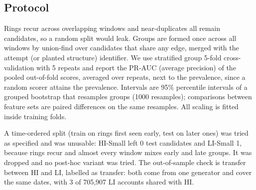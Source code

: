 \documentclass[conference]{IEEEtran}
\begin{document}
\begin{table}[t]
\caption{Primary-variant data (ambiguous candidates excluded). Prevalence is the share of positive candidates; the effective sample size is the number of positive groups. IBM: $\tau$ quantile 0.05, maximum ring length 6, 5-day windows. Synthetic: $\tau$ 0.25, six seeds pooled per condition; ``hn'' = hard negatives, ``chords'' = dense\_internal\_chords.}
\label{tab:data}
\centering
\small
{}
\end{table}

\subsection{Protocol}
Rings recur across overlapping windows and near-duplicates all remain candidates, so a random split would leak. Groups are formed once across all windows by union-find over candidates that share any edge, merged with the attempt (or planted structure) identifier. We use stratified group 5-fold cross-validation with 5 repeats and report the PR-AUC (average precision) of the pooled out-of-fold scores, averaged over repeats, next to the prevalence, since a random scorer attains the prevalence. Intervals are 95\% percentile intervals of a grouped bootstrap that resamples groups (1000 resamples); comparisons between feature sets are paired differences on the same resamples. All scaling is fitted inside training folds.

A time-ordered split (train on rings first seen early, test on later ones) was tried as specified and was unusable: HI-Small left 0 test candidates and LI-Small 1, because rings recur and almost every window mixes early and late groups. It was dropped and no post-hoc variant was tried. The out-of-sample check is transfer between HI and LI, labelled as transfer: both come from one generator and cover the same dates, with 3 of 705{,}907 LI accounts shared with HI.
\end{document}
